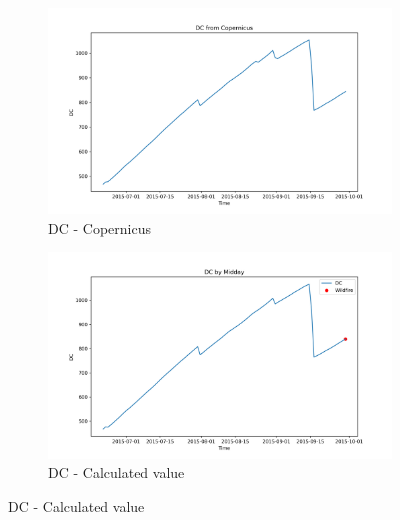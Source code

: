 \begin{figure}[h]
\caption{Comparison of DC calculated values and Copernicus}
    \centering
    \begin{subfigure}{0.49\textwidth}
        \centering
        \includegraphics[width=\textwidth]{graphs/2015MesmoSitio/2015CopernicusDC12.png}
        \caption{DC - Copernicus}
        \label{fig:dc_copernicus_2015_semfogo}
    \end{subfigure}
    \hfill
    \begin{subfigure}{0.49\textwidth}
        \centering
        \includegraphics[width=\textwidth]{graphs/2015MesmoSitio/2015CalcDC12.png}
        \caption{DC - Calculated value}
        \label{fig:dc_calculated_2015_semfogo}
    \end{subfigure}
    \label{fig:comparison_dc_semfogo_copernicus_calculated}
\end{figure}

